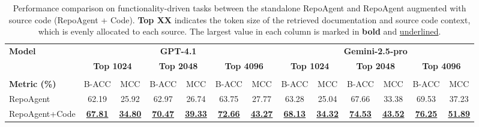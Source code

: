 
\begin{table}[t]
\centering
\caption{Performance comparison on functionality-driven tasks between the standalone RepoAgent and RepoAgent augmented with source code (RepoAgent + Code).
\textbf{Top XX} indicates the token size of the retrieved documentation and source code context, which is evenly allocated to each source. The largest value in each column is marked in \textbf{bold} and \underline{underlined}.}
\vspace{-1em}

\label{tab:rq2_results}
\setlength{\tabcolsep}{5.5pt}

\begin{tabular}{l|cc|cc|cc|cc|cc|cc}
\toprule
\multirow{2}{*}{\textbf{Model}} & \multicolumn{6}{c|}{\textbf{GPT-4.1}} & \multicolumn{6}{c}{\textbf{Gemini-2.5-pro}} \\
& \multicolumn{2}{c}{\textbf{Top 1024}} & \multicolumn{2}{c}{\textbf{Top 2048}} & \multicolumn{2}{c|}{\textbf{Top 4096}} & \multicolumn{2}{c}{\textbf{Top 1024}} & \multicolumn{2}{c}{\textbf{Top 2048}} & \multicolumn{2}{c}{\textbf{Top 4096}} \\ \midrule
\rowcolor{mygreen} \multicolumn{13}{c}{\textbf{Functionality Detection}} \\ \midrule
\rowcolor{gray!20} \textbf{Metric (\%)} & B-ACC & MCC & B-ACC & MCC & B-ACC & MCC & B-ACC & MCC & B-ACC & MCC & B-ACC & MCC \\ \midrule
RepoAgent  & 62.19 & 25.92 & 62.97 & 26.74 & 63.75 & 27.77 & 63.28 & 25.04 & 67.66 & 33.38 & 69.53 & 37.23 \\
RepoAgent+Code   & \underline{\textbf{67.81}} & \underline{\textbf{34.80}} & \underline{\textbf{70.47}} & \underline{\textbf{39.33}} & \underline{\textbf{72.66}} & \underline{\textbf{43.27}} & \underline{\textbf{68.13}} & \underline{\textbf{34.32}} & \underline{\textbf{74.53}} & \underline{\textbf{43.52}} & \underline{\textbf{76.25}} & \underline{\textbf{51.89}} \\ \midrule


\end{tabular}
\end{table}
